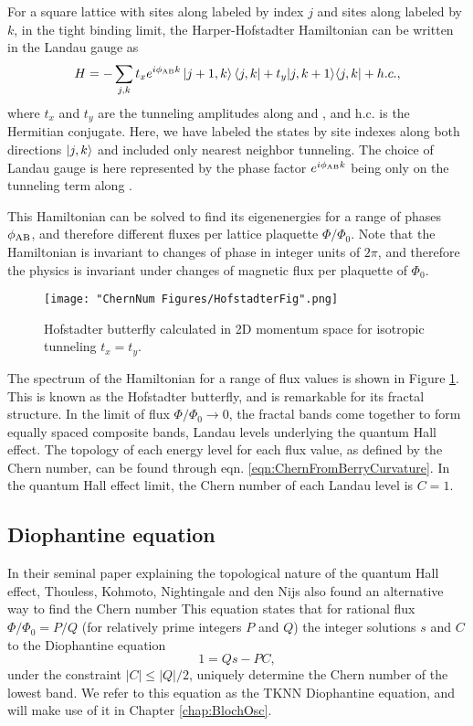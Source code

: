 For a square lattice with sites along \ex{} labeled by index $j$ and sites along \ey{} labeled by $k$, in the tight binding limit, the Harper-Hofstadter Hamiltonian can be written in the Landau gauge as
\begin{equation}
H=-\sum_{j,k} t_x e^{i\phi_{\rm AB}k}\mathinner{|{j+1,k}\rangle}\mathinner{\langle{j,k}|}+t_y|j,k+1\rangle\langle j,k| +  h.c.,
\label{eqn:hofstadterHam}
\end{equation} 
where $t_x$ and $t_y$ are the tunneling amplitudes along \ex{} and \ey{}, and h.c. is the Hermitian conjugate. Here, we have labeled the states by site indexes along both directions $\mathinner{|{j,k}\rangle}$ and included only nearest neighbor tunneling. The choice of Landau gauge is here represented by the phase factor $e^{i\phi_{\rm AB}k}$ being only on the tunneling term along \ex{}.

This Hamiltonian can be solved to find its eigenenergies for a range of phases  $\phi_{\rm AB}$, and therefore different fluxes per lattice plaquette $\Phi/\Phi_0$. Note that the Hamiltonian is invariant to changes of phase in integer units of $2\pi$, and therefore the physics is invariant under changes of magnetic flux per plaquette of $\Phi_0$. 

\begin{figure}
	\texttt{[image: "ChernNum Figures/HofstadterFig".png]}
\label{fig:Hofstadter}
\caption[Hofstadter butterfly]{Hofstadter butterfly calculated in 2D momentum space for isotropic tunneling $t_x=t_y$.}
\end{figure}
The spectrum of the Hamiltonian for a range of flux values is shown in Figure \ref{fig:Hofstadter}. This is known as the Hofstadter butterfly, and is remarkable for its fractal structure. In the limit of flux $\Phi/\Phi_0\rightarrow0$, the fractal bands come together to form equally spaced composite bands, Landau levels underlying the quantum Hall effect\cite{Ando1975,Klitzing1980,Laughlin1981}. The topology of each energy level for each flux value, as defined by the Chern number, can be found through eqn. \ref{eqn:ChernFromBerryCurvature}. In the quantum Hall effect limit, the Chern number of each Landau level is $C=1$.

\subsection{Diophantine equation} 	
In their seminal paper explaining the topological nature of the quantum Hall effect\cite{Thouless1982}, Thouless, Kohmoto, Nightingale and den Nijs also found an alternative way to find the Chern number 
This equation states that for rational flux $\Phi/\Phi_0 = P/Q$ (for relatively prime integers $P$ and $Q$) the integer solutions  $s$ and $C$ to the Diophantine equation
\begin{equation}
1 = Q s - P C,
\label{eqn:Diophantine}
\end{equation}  
under the constraint $|C|\leq |Q|/2$\cite{Thouless1982, Kohmoto1989}, uniquely determine the Chern number of the lowest band. We refer to this equation as the TKNN Diophantine equation, and will make use of it in Chapter \ref{chap:BlochOsc}. 

